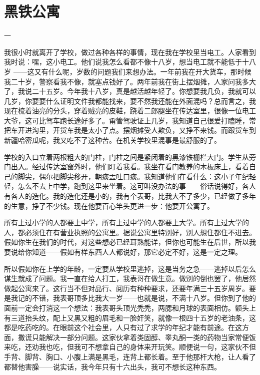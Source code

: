 \chapter{黑铁公寓}

一 

我很小时就离开了学校，做过各种各样的事情，现在我在学校里当电工。人家看到我时说：嘿，这小电工。他们说我怎么看都不像十八岁，想当电工就不能低于十八岁 ——这又有什么呢，岁数的问题我们来想办法。一年前我在开大货车，那时候我二十岁，警察看我不像，就塞点钱好了。两年前我在街上摆烟摊，人家问我多大了，我说二十五岁。今年我十八岁，真是越活越年轻了。你想要我几负，我就可以几岁，你要要什么证明文件我都能找来，要不然我还能在外面混吗？总而言之，我现在梳着油亮的分头，穿着贼亮的皮鞋，跷着二郎腿坐在传达室里，很像一位电工大爷，这可比驾车跑长途好多了。甭管驾驶证上几岁，我知道自己很爱打瞌睡，常把车开进沟里，开货车我是太小了点。摆烟摊受人欺负，又挣不来钱。而跟货车到新疆哈密瓜呢，我又吃不了这种苦。在机关学校里混事是最舒服的了。 

学校的入口立着两根粗大的门柱，门柱之间是紧闭着的黑漆铁栅栏大门。学生从旁门出入。经过传达室窗外时，他们盯着我看。我坐在看门教养的木板床上，看着自己的脚尖，偶尔把脚尖移开，朝痰盂吐口痰。我知道他们在看什么：这小子年纪轻轻，怎么不去上中学，跑到这里来坐着。这可叫没办法的事——俗话说得好，各人有各人的造化。我的造化还是小的，我有个表哥，比我大不了多少，已经做了多年的生意，挣了不少钱。现在他要百心竿头更进一步：他要开公寓了。 



所有上过小学的人都要上中学，所有上过中学的人都要上大学。所有上过大学的人，都必须住在有营业执照的公寓里。据说公寓里特别好，别人想住都住不进去。假如你生在我们的时代，对这些想必已经耳熟能详，但你也可能生在后世，所以我要说给你知道——假如有样东西人人都说好，那它必定不好，这是一定之理。 

所以假如你在上学的年龄，一定要从学校里逃掉，这是当务之急——逃掉以后怎么谋生就成了问题。我一直在给人打工，我表哥在做生意。做别的倒也罢了，他居然做起公寓来了。这行当不但对品行、阅历有种种要求，还要年满三十五岁周岁。要是我记的不错，我表哥顶多比我大一岁——也就是说，不满十八岁。但你到了他的面前一定会打消这一个想法：我表哥头顶光秃秃，两腮和月球的表面相仿。额头上有三道抬头纹，配上又黑又粗的眉毛和一脸奸笑，就像一根四十五岁的老油条，这都是吃药吃的。在眼前这个社会里，人只有过了求学的年纪才能有前途。在这方面，撒谎只能解决一部分问题。这家伙拿着类固醇、睾丸酮一类的药物当家常便饭来吃，还劝我也吃，但我可不想拿自己的身体来开玩笑。顺便说一句，这家伙不但手背、脚背、胸口、小腹上满是黑毛，连背上都长着。至于他那杆大枪，让人看了都替他害臊——说实话，我今年只有十六出头，我可不想长这种东西。 

